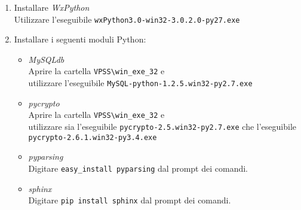 \documentclass[a4paper,twoside,10pt,openany]{scrbook}
\begin{document}
\begin{enumerate}
\begin{enumerate}
       \end{enumerate}
 \item Installare \emph{WxPython}\\
       Utilizzare l'eseguibile \texttt{wxPython3.0-win32-3.0.2.0-py27.exe}
 \item Installare i seguenti moduli Python:
 \begin{itemize}
  \item \emph{MySQLdb}\\
        Aprire la cartella \texttt{VPSS\textbackslash win\_exe\_32} e \\
        utilizzare l'eseguibile \texttt{MySQL-python-1.2.5.win32-py2.7.exe}
  \item \emph{pycrypto}\\
        Aprire la cartella \texttt{VPSS\textbackslash win\_exe\_32} e \\
        utilizzare sia l'eseguibile \texttt{pycrypto-2.5.win32-py2.7.exe}
        che l'eseguibile \texttt{pycrypto-2.6.1.win32-py3.4.exe}
        
  \item \emph{pyparsing}\\
       Digitare \texttt{easy\_install pyparsing} dal prompt dei comandi.
  \item \emph{sphinx}\\
       Digitare \texttt{pip install sphinx} dal prompt dei comandi.
 \end{itemize}
\end{enumerate}
%
\end{document}
